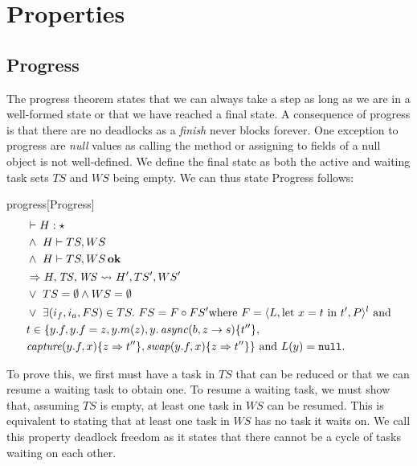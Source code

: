 \chapter{Properties}\label{proper}

\section{Progress}
The progress theorem states that we can always take a step as long as we are in a well-formed state or that we have reached a final state. A consequence of progress is that there are no deadlocks as a \textit{finish} never blocks forever. One exception to progress are \textit{null} values as calling the method or assigning to fields of a null object is not well-defined. We define the final state as both the active and waiting task sets $TS$ and $WS$ being empty. We can thus state Progress follows:

\begin{futuretheorem}{progress}[Progress]
\begin{alignat}{2}
    &\vdash H : \star \label{prog-prem-1}\\
    &\wedge\ H \vdash TS, WS \label{prog-prem-2}\\
    &\wedge\ H \vdash TS, WS \bn{ok} \label{prog-prem-3}\\
    &\Rightarrow \reductasks{}*[H']{}[TS', WS']* \label{prog-concl-1}\\
    &\vee\ TS = \emptyset \wedge WS = \emptyset \label{prog-concl-2}\\
    &\vee\ \exists (i_f, i_a, FS) \in TS.\ FS = F \circ FS' \text{where $F = \langle L, \text{let $x = t$ in $t'$}, P \rangle^l$ and}\\
\nonumber& \text{$t \in \{y.f, y.f = z, y.m(z),
y.\vn{async}(b, z \rightarrow s)\{t''\},$}\\
\nonumber& \text{$\vn{capture}(y.f, x)\{z \Rightarrow t''\}, \vn{swap}(y.f, x)\{z \Rightarrow t''\}\}$ and $L(y) = \mn{null}$.}\label{prog-concl-3} 
\end{alignat}
\end{futuretheorem}

To prove this, we first must have a task in $TS$ that can be reduced or that we can resume a waiting task to obtain one. To resume a waiting task, we must show that, assuming $TS$ is empty, at least one task in $WS$ can be resumed. This is equivalent to stating that at least one task in $WS$ has no task it waits on. We call this property deadlock freedom as it states that there cannot be a cycle of tasks waiting on each other.

